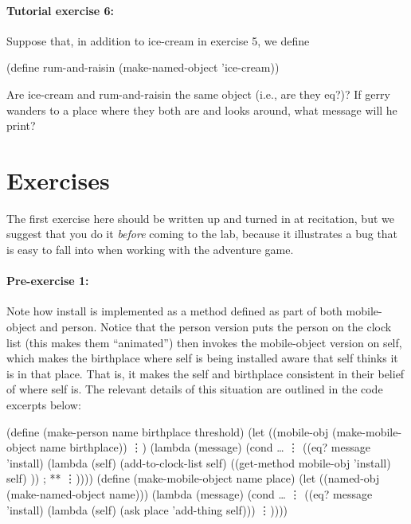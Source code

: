 \paragraph{Tutorial exercise 6:} Suppose that, in addition to {\cf
ice-cream} in exercise  5, we define

\beginlisp
(define rum-and-raisin (make-named-object 'ice-cream))
\endlisp

\noindent

Are {\cf ice-cream} and {\cf rum-and-raisin} the same object
(i.e., are they {\cf eq?})?  If {\cf gerry} wanders to a place where
they both are and looks around, what message will he print?


\section{Exercises}

The first exercise here should be written up and turned in at
recitation, but we suggest that you do it {\em before} coming to the
lab, because it illustrates a bug that is easy to fall into when
working with the adventure game.

\paragraph{Pre-exercise 1:}

Note how {\cf install} is implemented as a method defined as part of
both {\cf mobile-object} and {\cf person}. Notice that the {\cf
person} version puts the person on the clock list (this makes them
``animated'') then invokes the {\cf mobile-object} version on {\cf
self}, which makes the {\cf birthplace} where {\cf self} is being
installed aware that {\cf self} thinks it is in that place. That is,
it makes the {\cf self} and {\cf birthplace} consistent in their
belief of where {\cf self} is. The relevant details of this situation
are outlined in the code excerpts below:

\beginlisp
(define (make-person name birthplace threshold)
  (let ((mobile-obj (make-mobile-object name birthplace))
        \vdots)
    (lambda (message)
      (cond \ldots
            \vdots
            ((eq? message 'install)
             (lambda (self)
               (add-to-clock-list self)
               ((get-method mobile-obj 'install) self) ))   ; **
            \vdots))))
\null
(define (make-mobile-object name place)
  (let ((named-obj (make-named-object name)))
    (lambda (message)
      (cond \ldots
            \vdots
            ((eq? message 'install)
             (lambda (self)
               (ask place 'add-thing self)))
            \vdots))))
\endlisp
      
